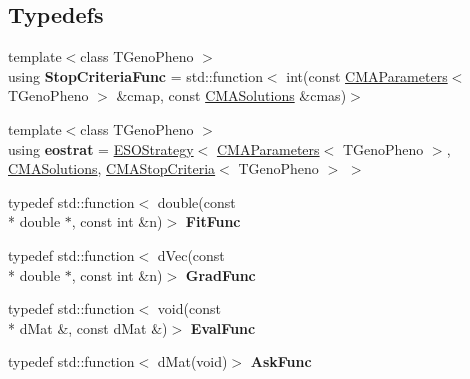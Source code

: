\subsection*{Typedefs}
\begin{DoxyCompactItemize}
\item 
\hypertarget{namespacelibcmaes_a0ea49cc676992a7089a563279ca35df0}{{\footnotesize template$<$class T\+Geno\+Pheno $>$ }\\using {\bfseries Stop\+Criteria\+Func} = std\+::function$<$ int(const \hyperlink{classlibcmaes_1_1CMAParameters}{C\+M\+A\+Parameters}$<$ T\+Geno\+Pheno $>$ \&cmap, const \hyperlink{classlibcmaes_1_1CMASolutions}{C\+M\+A\+Solutions} \&cmas)$>$}\label{namespacelibcmaes_a0ea49cc676992a7089a563279ca35df0}

\item 
\hypertarget{namespacelibcmaes_a5d26dcaad08b23bcacac2631ba9f0f2c}{{\footnotesize template$<$class T\+Geno\+Pheno $>$ }\\using {\bfseries eostrat} = \hyperlink{classlibcmaes_1_1ESOStrategy}{E\+S\+O\+Strategy}$<$ \hyperlink{classlibcmaes_1_1CMAParameters}{C\+M\+A\+Parameters}$<$ T\+Geno\+Pheno $>$, \hyperlink{classlibcmaes_1_1CMASolutions}{C\+M\+A\+Solutions}, \hyperlink{classlibcmaes_1_1CMAStopCriteria}{C\+M\+A\+Stop\+Criteria}$<$ T\+Geno\+Pheno $>$ $>$}\label{namespacelibcmaes_a5d26dcaad08b23bcacac2631ba9f0f2c}

\item 
\hypertarget{namespacelibcmaes_aaa4766cb6addd3ad397456a779436854}{typedef std\+::function$<$ double(const \\*
double $\ast$, const int \&n)$>$ {\bfseries Fit\+Func}}\label{namespacelibcmaes_aaa4766cb6addd3ad397456a779436854}

\item 
\hypertarget{namespacelibcmaes_ae29f09cdf8b5322ac32dc9ccddecd9dd}{typedef std\+::function$<$ d\+Vec(const \\*
double $\ast$, const int \&n)$>$ {\bfseries Grad\+Func}}\label{namespacelibcmaes_ae29f09cdf8b5322ac32dc9ccddecd9dd}

\item 
\hypertarget{namespacelibcmaes_aa2265af293af05f3bb2015aa9a4d3bb5}{typedef std\+::function$<$ void(const \\*
d\+Mat \&, const d\+Mat \&)$>$ {\bfseries Eval\+Func}}\label{namespacelibcmaes_aa2265af293af05f3bb2015aa9a4d3bb5}

\item 
\hypertarget{namespacelibcmaes_a97fc2a1efe35f5985451a770507c991f}{typedef std\+::function$<$ d\+Mat(void)$>$ {\bfseries Ask\+Func}}\label{namespacelibcmaes_a97fc2a1efe35f5985451a770507c991f}


\end{DoxyCompactItemize}

